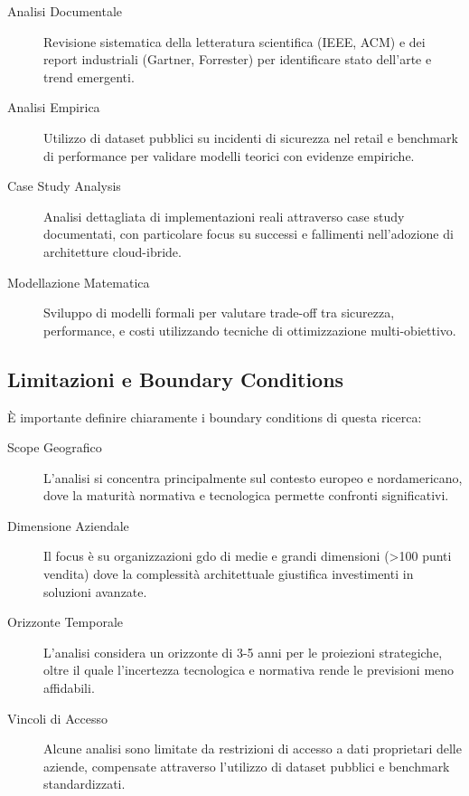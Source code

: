\begin{description}
    \item[Analisi Documentale] Revisione sistematica della letteratura scientifica (IEEE, ACM) e dei report industriali (Gartner, Forrester) per identificare stato dell'arte e trend emergenti.
    
    \item[Analisi Empirica] Utilizzo di dataset pubblici su incidenti di sicurezza nel retail e benchmark di performance per validare modelli teorici con evidenze empiriche.
    
    \item[Case Study Analysis] Analisi dettagliata di implementazioni reali attraverso case study documentati, con particolare focus su successi e fallimenti nell'adozione di architetture cloud-ibride.
    
    \item[Modellazione Matematica] Sviluppo di modelli formali per valutare trade-off tra sicurezza, performance, e costi utilizzando tecniche di ottimizzazione multi-obiettivo.
\end{description}

\subsection{Limitazioni e Boundary Conditions}
\label{subsec:limitazioni}

È importante definire chiaramente i boundary conditions di questa ricerca:

\begin{description}
    \item[Scope Geografico] L'analisi si concentra principalmente sul contesto europeo e nordamericano, dove la maturità normativa e tecnologica permette confronti significativi.
    
    \item[Dimensione Aziendale] Il focus è su organizzazioni \gls{gdo} di medie e grandi dimensioni (>100 punti vendita) dove la complessità architettuale giustifica investimenti in soluzioni avanzate.
    
    \item[Orizzonte Temporale] L'analisi considera un orizzonte di 3-5 anni per le proiezioni strategiche, oltre il quale l'incertezza tecnologica e normativa rende le previsioni meno affidabili.
    
    \item[Vincoli di Accesso] Alcune analisi sono limitate da restrizioni di accesso a dati proprietari delle aziende, compensate attraverso l'utilizzo di dataset pubblici e benchmark standardizzati.
\end{description}


